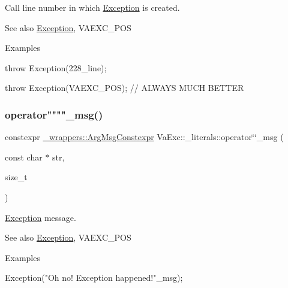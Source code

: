Call line number in which \hyperlink{class_va_exc_1_1_exception}{Exception} is created. 

\begin{DoxySeeAlso}{See also}
\hyperlink{class_va_exc_1_1_exception}{Exception}, V\+A\+E\+X\+C\+\_\+\+P\+OS 
\end{DoxySeeAlso}
\begin{DoxyParagraph}{Examples}

\begin{DoxyCode}
\textcolor{keywordflow}{throw} Exception(228\_line);

\textcolor{keywordflow}{throw} Exception(VAEXC\_POS); \textcolor{comment}{// ALWAYS MUCH BETTER}
\end{DoxyCode}
 
\end{DoxyParagraph}
\mbox{\label{namespace_va_exc_1_1__literals_a9fd72d243b5f2b1d7d41d64c399e0368}} 
\subsubsection{\texorpdfstring{operator""""\+\_\+msg()}{operator""\_msg()}}
{\footnotesize\ttfamily constexpr \hyperlink{struct_va_exc_1_1__wrappers_1_1_arg_msg_constexpr}{\+\_\+wrappers\+::\+Arg\+Msg\+Constexpr} Va\+Exc\+::\+\_\+literals\+::operator\char`\"{}\char`\"{}\+\_\+msg (\begin{DoxyParamCaption}\item[{const char $\ast$}]{str,  }\item[{size\+\_\+t}]{ }\end{DoxyParamCaption})\hspace{0.3cm}{\ttfamily [noexcept]}}



\hyperlink{class_va_exc_1_1_exception}{Exception} message. 

\begin{DoxySeeAlso}{See also}
\hyperlink{class_va_exc_1_1_exception}{Exception}, V\+A\+E\+X\+C\+\_\+\+P\+OS 
\end{DoxySeeAlso}
\begin{DoxyParagraph}{Examples}

\begin{DoxyCode}
Exception(\textcolor{stringliteral}{"Oh no! Exception happened!"}\_msg);
\end{DoxyCode}
 
\end{DoxyParagraph}
